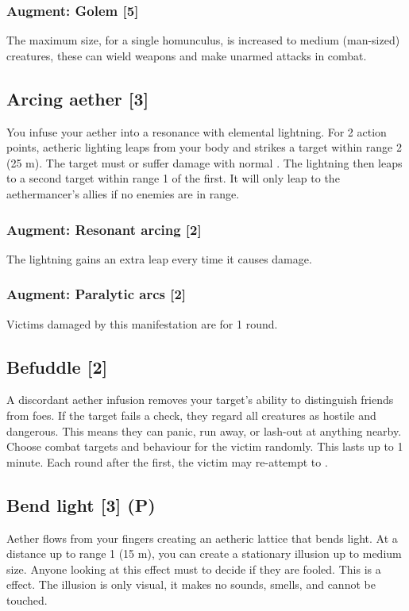 \subsubsection{Augment: Golem [5]}
The maximum size, for a single homunculus, is increased to medium (man-sized) creatures, these can wield weapons and make unarmed attacks in combat. 


\subsection{Arcing aether [3]}
You infuse your aether into a resonance with elemental lightning. For 2 action points, aetheric lighting leaps from your body and strikes a target within range 2 (25 m). The target must  or suffer damage with normal . The lightning then leaps to a second target within range 1 of the first. It will only leap to the aethermancer's allies if no enemies are in range. 
\subsubsection{Augment: Resonant arcing [2]}
The lightning gains an extra leap every time it causes damage.
\subsubsection{Augment: Paralytic arcs [2]}
Victims damaged by this manifestation are  for 1 round.

\subsection{Befuddle [2]}
A discordant aether infusion removes your target's ability to distinguish friends from foes. If the target fails a  check, they regard all creatures as hostile and dangerous. This means they can panic, run away, or lash-out at anything nearby. Choose combat targets and behaviour for the victim randomly. This lasts up to 1 minute. Each round after the first, the victim may re-attempt to .


\subsection{Bend light [3] (P)}
\label{spell:bend-light}
Aether flows from your fingers creating an aetheric lattice that bends light. At a distance up to range 1 (15 m), you can create a stationary illusion up to medium size. Anyone looking at this effect must  to decide if they are fooled. This is a  effect. The illusion is only visual, it makes no sounds, smells, and cannot be touched. 
